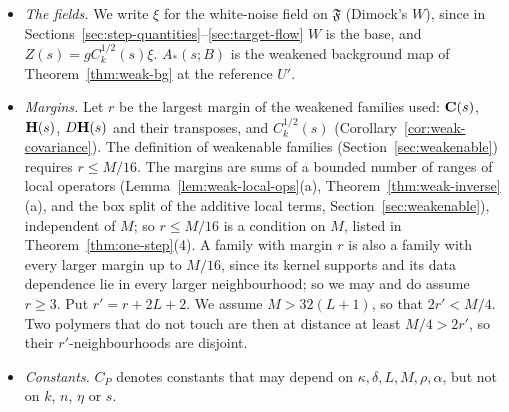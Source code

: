 \begin{itemize}
At critical backgrounds these are $V^0$ and $V'$ of Lemma~\ref{lem:composition}. They are local in $U'$ and covariant, and analytic at complex references by Proposition~\ref{prop:AB}(i). The elimination of Lemma~\ref{lem:eliminate} is taken at the base $W$. In that lemma the parameter $\mathsf a$ is defined through the curvature $\eps'_1$ of $V'$; at a general reference it is replaced by a bound on the curvatures of the real parts $U'_r$ and $(U'_r)^{(k)}$, which is all the proof uses. At complex bases the elimination is analytic in the reference, by the argument in the proof of Corollary~\ref{cor:covariance} together with Proposition~\ref{prop:AB}(i),(vi). This needs $C_{\rm AB}\delta_c\le c'_L$, which is part of the smallness of $\delta_P$ (Proposition~\ref{prop:complex-ext}). It gives $\zeta_c$, $\hat Z$, $\hat Z^1$, $\hat Z^2$, with $|\hat Z(Z)|_\infty\le CL^d|Z|_\infty$.
\item \emph{The fields.} We write $\xi$ for the white-noise field on $\mathfrak F$ (Dimock's $W$), since in Sections~\ref{sec:step-quantities}--\ref{sec:target-flow} $W$ is the base, and $Z(s)=gC_k^{1/2}(s)\xi$. $A_*(s;B)$ is the weakened background map of Theorem~\ref{thm:weak-bg} at the reference $U'$.
\item \emph{Margins.} Let $r$ be the largest margin of the weakened families used: $\mathbf C(s)$, $\mathbf H(s)$, $D\mathbf H(s)$ and their transposes, and $C_k^{1/2}(s)$ (Corollary~\ref{cor:weak-covariance}). The definition of weakenable families (Section~\ref{sec:weakenable}) requires $r\le M/16$. The margins are sums of a bounded number of ranges of local operators (Lemma~\ref{lem:weak-local-ops}(a), Theorem~\ref{thm:weak-inverse}(a), and the box split of the additive local terms, Section~\ref{sec:weakenable}), independent of $M$; so $r\le M/16$ is a condition on $M$, listed in Theorem~\ref{thm:one-step}(4). A family with margin $r$ is also a family with every larger margin up to $M/16$, since its kernel supports and its data dependence lie in every larger neighbourhood; so we may and do assume $r\ge3$. Put $r'=r+2L+2$. We assume $M>32(L+1)$, so that $2r'<M/4$. Two polymers that do not touch are then at distance at least $M/4>2r'$, so their $r'$-neighbourhoods are disjoint.
\item \emph{Constants.} $C_P$ denotes constants that may depend on $\kappa,\delta,L,M,\rho,\alpha$, but not on $k$, $n$, $\eta$ or $s$.
\end{itemize}

